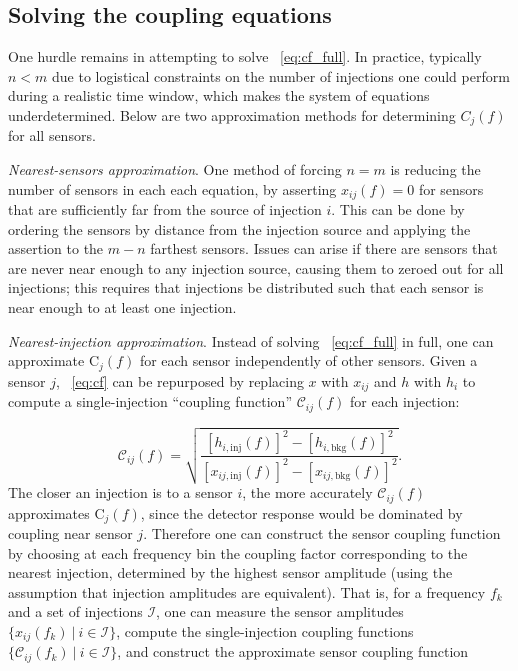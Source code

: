 \subsection{Solving the coupling equations}

One hurdle remains in attempting to solve ~\cref{eq:cf_full}.
In practice, typically $n<m$ due to logistical constraints on the number of injections one could perform during a realistic time window, which makes the system of equations underdetermined.
Below are two approximation methods for determining $C_j(f)$ for all sensors.

\textit{Nearest-sensors approximation}.
One method of forcing $n=m$ is reducing the number of sensors in each each equation, by asserting $x_{ij}(f)=0$ for sensors that are sufficiently far from the source of injection $i$.
This can be done by ordering the sensors by distance from the injection source and applying the assertion to the $m-n$ farthest sensors.
Issues can arise if there are sensors that are never near enough to any injection source, causing them to zeroed out for all injections; this requires that injections be distributed such that each sensor is near enough to at least one injection.

\textit{Nearest-injection approximation}.
Instead of solving ~\cref{eq:cf_full} in full, one can approximate $\mathrm{C}_j(f)$ for each sensor independently of other sensors.
Given a sensor $j$, ~\cref{eq:cf} can be repurposed by replacing $x$ with $x_{ij}$ and $h$ with $h_i$ to compute a single-injection ``coupling function'' $\mathcal{C}_{ij}(f)$ for each injection:

\begin{equation}\label{eq:sicf}
	\mathcal{C}_{ij}(f) = \sqrt{\frac{[h_{i,\textrm{inj}}(f)]^2 - [h_{i,\textrm{bkg}}(f)]^2}{[x_{ij,\textrm{inj}}(f)]^2 - [x_{ij,\textrm{bkg}}(f)]^2}}.
\end{equation}
The closer an injection is to a sensor $i$, the more accurately $\mathcal{C}_{ij}(f)$ approximates $\mathrm{C}_j(f)$, since the detector response would be dominated by coupling near sensor $j$.
Therefore one can construct the sensor coupling function by choosing at each frequency bin the coupling factor corresponding to the nearest injection, determined by the highest sensor amplitude (using the assumption that injection amplitudes are equivalent).
That is, for a frequency $f_k$ and a set of injections $\mathcal{I}$, one can measure the sensor amplitudes $\{x_{ij}(f_k)\ |\ i \in \mathcal{I}\}$, compute the single-injection coupling functions $\{\mathcal{C}_{ij}(f_k)\ |\ i \in \mathcal{I}\}$, and construct the approximate sensor coupling function

